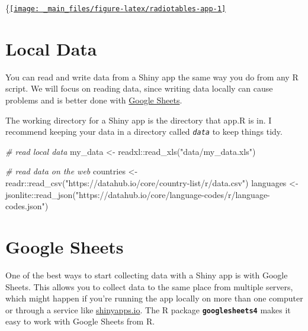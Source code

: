 \documentclass[
  oneside]{book}
\newenvironment{Shaded}{\begin{snugshade}}{\end{snugshade}}
\newcommand{\CommentTok}[1]{\textcolor[rgb]{0.56,0.35,0.01}{\textit{#1}}}
\newcommand{\FunctionTok}[1]{\textcolor[rgb]{0.00,0.00,0.00}{#1}}
\newcommand{\NormalTok}[1]{#1}
\newcommand{\OtherTok}[1]{\textcolor[rgb]{0.56,0.35,0.01}{#1}}
\newcommand{\SpecialCharTok}[1]{\textcolor[rgb]{0.00,0.00,0.00}{#1}}
\newcommand{\StringTok}[1]{\textcolor[rgb]{0.31,0.60,0.02}{#1}}
\begin{document}
\{\centering \href{https://shiny.psy.gla.ac.uk/debruine/radiotables/}{\texttt{[image: \_main\_files/figure-latex/radiotables-app-1]} }

\hypertarget{local-data}{%
\section{Local Data}\label{local-data}}

You can read and write data from a Shiny app the same way you do from any R script. We will focus on reading data, since writing data locally can cause problems and is better done with \protect\hyperlink{google_sheets}{Google Sheets}.

The working directory for a Shiny app is the directory that app.R is in. I recommend keeping your data in a directory called \textit{\texttt{data}} to keep things tidy.

\begin{Shaded}
\begin{Highlighting}[]
\CommentTok{\# read local data}
\NormalTok{my\_data }\OtherTok{\textless{}{-}}\NormalTok{ readxl}\SpecialCharTok{::}\FunctionTok{read\_xls}\NormalTok{(}\StringTok{"data/my\_data.xls"}\NormalTok{)}

\CommentTok{\# read data on the web}
\NormalTok{countries }\OtherTok{\textless{}{-}}\NormalTok{ readr}\SpecialCharTok{::}\FunctionTok{read\_csv}\NormalTok{(}\StringTok{"https://datahub.io/core/country{-}list/r/data.csv"}\NormalTok{)}
\NormalTok{languages }\OtherTok{\textless{}{-}}\NormalTok{ jsonlite}\SpecialCharTok{::}\FunctionTok{read\_json}\NormalTok{(}\StringTok{"https://datahub.io/core/language{-}codes/r/language{-}codes.json"}\NormalTok{)}
\end{Highlighting}
\end{Shaded}

\hypertarget{google_sheets}{%
\section{Google Sheets}\label{google_sheets}}

One of the best ways to start collecting data with a Shiny app is with Google Sheets. This allows you to collect data to the same place from multiple servers, which might happen if you're running the app locally on more than one computer or through a service like \href{https://shinyapps.io}{shinyapps.io}. The R package \textbf{\texttt{googlesheets4}} makes it easy to work with Google Sheets from R.
\end{document}

